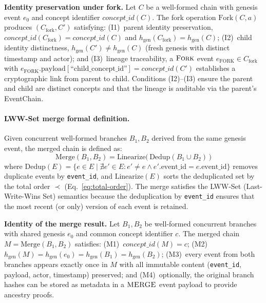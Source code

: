 \textbf{Identity preservation under fork.} Let $C$ be a well-formed chain with genesis event $e_0$ and concept identifier $\textit{concept\_id}(C)$. The fork operation $\text{Fork}(C, a)$ produces $(C_{\text{fork}}, C')$ satisfying: (I1)~parent identity preservation, $\textit{concept\_id}(C_{\text{fork}}) = \textit{concept\_id}(C)$ and $h_{\text{gen}}(C_{\text{fork}}) = h_{\text{gen}}(C)$; (I2)~child identity distinctness, $h_{\text{gen}}(C') \neq h_{\text{gen}}(C)$ (fresh genesis with distinct timestamp and actor); and (I3)~lineage traceability, a $\textsc{Fork}$ event $e_{\text{FORK}} \in C_{\text{fork}}$ with $e_{\text{FORK}}.\text{payload}[\text{``child\_concept\_id''}] = \textit{concept\_id}(C')$ establishes a cryptographic link from parent to child. Conditions (I2)--(I3) ensure the parent and child are distinct concepts and that the lineage is auditable via the parent's EventChain.

\paragraph{LWW-Set merge formal definition.} Given concurrent well-formed branches $B_1, B_2$ derived from the same genesis event, the merged chain is defined as:
\begin{equation}\label{eq:lww-merge}
    \text{Merge}(B_1, B_2) = \text{Linearize}\bigl(\,\text{Dedup}(B_1 \cup B_2)\,\bigr)
\end{equation}
where $\text{Dedup}(E) = \{ e \in E \mid \nexists e' \in E : e' \neq e \land e'.\text{event\_id} = e.\text{event\_id} \}$ removes duplicate events by \texttt{event\_id}, and $\text{Linearize}(E)$ sorts the deduplicated set by the total order $\prec$ (Eq.~\ref{eq:total-order}). The merge satisfies the LWW-Set (Last-Write-Wins Set) semantics because the deduplication by \texttt{event\_id} ensures that the most recent (or only) version of each event is retained.

\textbf{Identity of the merge result.} Let $B_1, B_2$ be well-formed concurrent branches with shared genesis $e_0$ and common concept identifier $c$. The merged chain $M = \text{Merge}(B_1, B_2)$ satisfies: (M1)~$\textit{concept\_id}(M) = c$; (M2)~$h_{\text{gen}}(M) = h_{\text{gen}}(e_0) = h_{\text{gen}}(B_1) = h_{\text{gen}}(B_2)$; (M3)~every event from both branches appears exactly once in $M$ with all immutable content (\texttt{event\_id}, payload, actor, timestamp) preserved; and (M4)~optionally, the original branch hashes can be stored as metadata in a $\textsc{MERGE}$ event payload to provide ancestry proofs.

